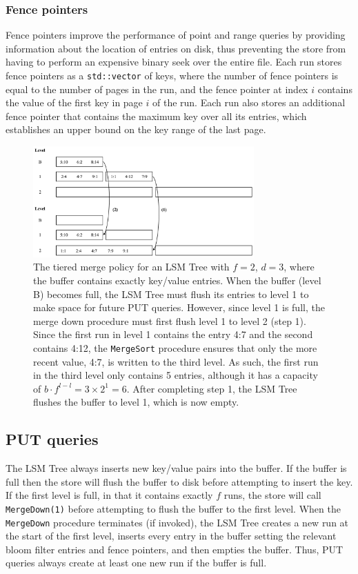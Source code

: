\documentclass{acm}
\begin{document}
\subsubsection{Fence pointers}

Fence pointers improve the performance of point and range queries by providing information about the location of entries on disk, thus preventing the store from having to perform an expensive binary seek over the entire file. Each run stores fence pointers as a \texttt{std::vector} of keys, where the number of fence pointers is equal to the number of pages in the run, and the fence pointer at index $i$ contains the value of the first key in page $i$ of the run. Each run also stores an additional fence pointer that contains the maximum key over all its entries, which establishes an upper bound on the key range of the last page.

\begin{figure}
\includegraphics[width=3.33in]{merge}
\caption{The tiered merge policy for an LSM Tree with $f=2$, $d=3$, where the buffer contains exactly key/value entries. When the buffer (level B) becomes full, the LSM Tree must flush its entries to level 1 to make space for future PUT queries. However, since level 1 is full, the merge down procedure must first flush level 1 to level 2 (step 1). Since the first run in level 1 contains the entry 4:7 and the second contains 4:12, the \texttt{MergeSort} procedure ensures that only the more recent value, 4:7, is written to the third level. As such, the first run in the third level only contains 5 entries, although it has a capacity of $b \cdot f^{l-l} = 3 \times 2^1 = 6$. After completing step 1, the LSM Tree flushes the buffer to level 1, which is now empty.}
\label{fig:merge}
\end{figure}

\subsection{PUT queries}

The LSM Tree always inserts new key/value pairs into the buffer. If the buffer is full then the store will flush the buffer to disk before attempting to insert the key. If the first level is full, in that it contains exactly $f$ runs, the store will call \texttt{MergeDown(1)} before attempting to flush the buffer to the first level. When the \texttt{MergeDown} procedure terminates (if invoked), the LSM Tree creates a new run at the start of the first level, inserts every entry in the buffer setting the relevant bloom filter entries and fence pointers, and then empties the buffer. Thus, PUT queries always create at least one new run if the buffer is full.
\end{document}
